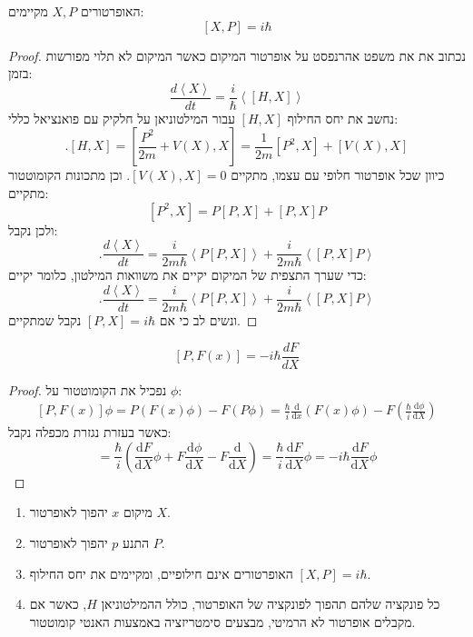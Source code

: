 \documentclass{tstextbook}
\begin{document}
\begin{proposition}
האופרטורים \(X,P\) מקיימים:
$$[X,P]=i\hbar$$

\end{proposition}
\begin{proof}
נכתוב את את משפט אהרנפסט על אופרטור המיקום כאשר המיקום לא תלוי מפורשות בזמן:
$${\frac{d\left\langle X\right\rangle}{d t}}={\frac{i}{\hbar}}\left\langle\left[H,X\right]\right\rangle$$
נחשב את יחס החילוף \([H,X]\) עבור המילטוניאן על חלקיק עם פואנציאל כללי:
$$.\left[H,X\right]=\left[{\frac{P^{2}}{2m}}+V\left(X\right),X\right]={\frac{1}{2m}}\left[P^{2},X\right]+\left[V\left(X\right),X\right]$$
כיוון שכל אופרטור חלופי עם עצמו, מתקיים \([V(X),X]=0\). וכן מתכונות הקומוטטור מתקיים:
$$\left[P^{2},X\right]=P\left[P,X\right]+\left[P,X\right]P$$
ולכן נקבל:
$$.\frac{d\left\langle X\right\rangle}{d t}=\frac{i}{2m\hbar}\left\langle P\left[P,X\right]\right\rangle+\frac{i}{2m\hbar}\left\langle\left[P,X\right]P\right\rangle$$
כדי שערך התצפית של המיקום יקיים את משוואות המילטון, כלומר יקיים:
$$.\frac{d\left\langle X\right\rangle}{d t}=\frac{i}{2m\hbar}\left\langle P\left[P,X\right]\right\rangle+\frac{i}{2m\hbar}\left\langle\left[P,X\right]P\right\rangle$$
ונשים לב כי אם \([P,X]=i\hbar\) נקבל שמתקיים.

\end{proof}
\begin{proposition}
$$[P,F(x)]=-i\hbar{\frac{d F}{d X}}$$

\end{proposition}
\begin{proof}
נפכיל את הקומוטטור על \(\phi\):
$$\begin{gather}[P,F(x)]\phi=P\left( F(x)\phi \right)-F\left( P\phi \right)=\frac{\hbar}{i}\frac{\mathrm{d} }{\mathrm{d} x}\left( F(x)\phi \right) -F\left( \frac{\hbar}{i}\frac{\mathrm{d} \phi}{\mathrm{d} X}  \right)  
\end{gather}$$
כאשר בעזרת נגזרת מכפלה נקבל:
$$=\frac{\hbar}{i}\left( \frac{\mathrm{d} F}{\mathrm{d} X}\phi +F\frac{\mathrm{d} \phi}{\mathrm{d} X}  -F\frac{\mathrm{d} }{\mathrm{d} X} \right)=\frac{\hbar}{i}\frac{\mathrm{d} F}{\mathrm{d} X}\phi =-i\hbar \frac{\mathrm{d} F}{\mathrm{d} X} \phi$$

\end{proof}
\begin{proposition}[סד"פ קוונטיזציה]
  \begin{enumerate}
    \item מיקום \(x\) יהפוך לאופרטור \(X\). 


    \item התנע \(p\) יהפוך לאופרטור \(P\). 


    \item האופרטורים אינם חילופיים, ומקיימים את יחס החילוף \([X,P]=i\hbar\). 


    \item כל פונקציה שלהם תהפוך לפונקציה של האופרטור, כולל ההמילטוניאן \(H\), כאשר אם מקבלים אופרטור לא הרמיטי, מבצעים סימטריזציה באמצעות האנטי קומוטטור. 


  \end{enumerate}
\end{proposition}
\end{document}

